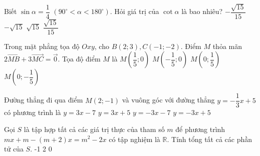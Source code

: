 \begin{ex}%
Biết $\sin \alpha=\dfrac{1}{4}$ $(90^\circ < \alpha <180^\circ)$. Hỏi giá trị của $\cot \alpha$ là bao nhiêu?
\choice
{$-\dfrac{\sqrt{15}}{15}$}
{\True $-\sqrt{15}$}
{$\sqrt{15}$}
{$\dfrac{\sqrt{15}}{15}$}
\end{ex}
\begin{ex}%
Trong mặt phẳng tọa độ $Oxy$, cho $B(2;3),C(-1;-2)$. Điểm $M$ thỏa mãn $2\vec{MB}+3\vec{MC}=\vec{0}$. Tọa độ điểm $M$ là
\choice
{\True $M\left(\dfrac{1}{5};0\right)$}
{$M\left(-\dfrac{1}{5};0\right)$}
{$M\left(0;\dfrac{1}{5} \right)$}
{$M\left(0;-\dfrac{1}{5} \right)$}
\end{ex}
\begin{ex}%
Đường thẳng đi qua điểm $M(2;-1)$ và vuông góc với đường thẳng $y=-\dfrac{1}{3}x+5$ có phương trình là
\choice
{\True $y=3x-7$}
{$y=3x+5$}
{$y=-3x-7$}
{$y=-3x+5$}
\end{ex}
\begin{ex}%
Gọi $S$ là tập hợp tất cả các giá trị thực của tham số $m$ để phương trình $mx+m-(m+2)x=m^2-2x$ có tập nghiệm là $\mathbb{R}$. Tính tổng tất cả các phần tử của $S$.
\choice
{}
{-1}
{2}
{0}
\end{ex}

